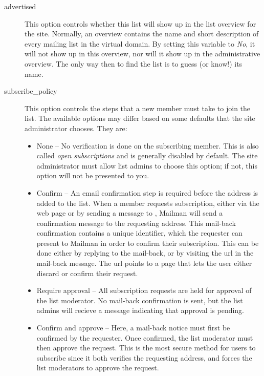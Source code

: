 \documentclass{howto}
\begin{document}
\begin{description}
\item[advertised]
    This option controls whether this list will show up in the list
    overview for the site.  Normally, an overview contains the name
    and short description of every mailing list in the virtual
    domain.  By setting this variable to \emph{No}, it will not show
    up in this overview, nor will it show up in the administrative
    overview.  The only way then to find the list is to guess (or
    know!) its name.

\item[subscribe_policy]
    This option controls the steps that a new member must take to join
    the list.  The available options may differ based on some defaults
    that the site administrator chooses.  They are:

    \begin{itemize}
    \item None -- No verification is done on the subscribing
          member. This is also called \emph{open subscriptions} and is
          generally disabled by default.  The site administrator must
          allow list admins to choose this option; if not, this option
          will not be presented to you.

    \item Confirm -- An email confirmation step is required before the
          address is added to the list.  When a member requests
          subscription, either via the web page or by sending a
          message to , Mailman
          will send a confirmation message to the requesting address.
          This mail-back confirmation contains a unique identifier,
          which the requester can present to Mailman in order to
          confirm their subscription.  This can be done either by
          replying to the mail-back, or by visiting the url in the
          mail-back message.  The url points to a page that lets the
          user either discard or confirm their request.

    \item Require approval -- All subscription requests are held for
          approval of the list moderator.  No mail-back confirmation
          is sent, but the list admins will recieve a message
          indicating that approval is pending.

    \item Confirm and approve -- Here, a mail-back notice must first
          be confirmed by the requester.  Once confirmed, the list
          moderator must then approve the request.  This is the most
          secure method for users to subscribe since it both verifies
          the requesting address, and forces the list moderators to
          approve the request.


\end{itemize}
\end{description}
\end{document}
